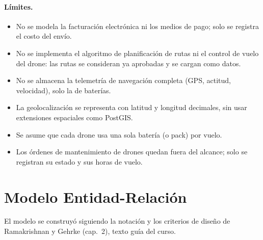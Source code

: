 \documentclass[11pt,a4paper]{article}
\begin{document}
\paragraph{Límites.}
\begin{itemize}
\item No se modela la facturación electrónica ni los medios de pago; solo se registra el costo del envío.
\item No se implementa el algoritmo de planificación de rutas ni el control de vuelo del drone: las rutas se consideran ya aprobadas y se cargan como datos.
\item No se almacena la telemetría de navegación completa (GPS, actitud, velocidad), solo la de baterías.
\item La geolocalización se representa con latitud y longitud decimales, sin usar extensiones espaciales como PostGIS.
\item Se asume que cada drone usa una sola batería (o pack) por vuelo.
\item Los órdenes de mantenimiento de drones quedan fuera del alcance; solo se registran su estado y sus horas de vuelo.
\end{itemize}

\section{Modelo Entidad-Relación}

El modelo se construyó siguiendo la notación y los criterios de diseño de Ramakrishnan y Gehrke (cap.~2), texto guía del curso.
\end{document}
